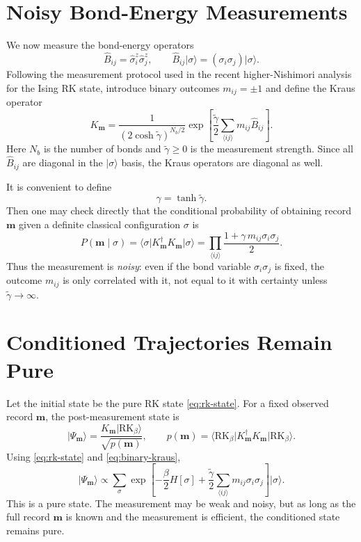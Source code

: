 \documentclass[11pt]{article}
\newcommand{\ket}[1]{\lvert #1\rangle}
\newcommand{\bra}[1]{\langle #1\rvert}
\begin{document}
\section{Noisy Bond-Energy Measurements}

We now measure the bond-energy operators
\begin{equation}
\hat B_{ij} = \hat\sigma_i^z \hat\sigma_j^z,
\qquad
\hat B_{ij}\ket{\sigma} = (\sigma_i\sigma_j)\ket{\sigma}.
\end{equation}
Following the measurement protocol used in the recent higher-Nishimori analysis for the Ising RK state, introduce binary outcomes $m_{ij}=\pm1$ and define the Kraus operator
\begin{equation}
K_{\bm m}
=
\frac{1}{(2\cosh\tilde\gamma)^{N_b/2}}
\exp\!\left[
\frac{\tilde\gamma}{2}\sum_{\langle ij\rangle} m_{ij}\hat B_{ij}
\right].
\label{eq:binary-kraus}
\end{equation}
Here $N_b$ is the number of bonds and $\tilde\gamma\ge 0$ is the measurement strength. Since all $\hat B_{ij}$ are diagonal in the $\ket{\sigma}$ basis, the Kraus operators are diagonal as well.

It is convenient to define
\begin{equation}
\gamma = \tanh\tilde\gamma.
\label{eq:gamma-def}
\end{equation}
Then one may check directly that the conditional probability of obtaining record $\bm m$ given a definite classical configuration $\sigma$ is
\begin{equation}
P(\bm m \mid \sigma)
=
\bra{\sigma} K_{\bm m}^\dagger K_{\bm m}\ket{\sigma}
=
\prod_{\langle ij\rangle}
\frac{1+\gamma\, m_{ij}\sigma_i\sigma_j}{2}.
\label{eq:binary-likelihood}
\end{equation}
Thus the measurement is \emph{noisy}: even if the bond variable $\sigma_i\sigma_j$ is fixed, the outcome $m_{ij}$ is only correlated with it, not equal to it with certainty unless $\tilde\gamma\to\infty$.

\section{Conditioned Trajectories Remain Pure}

Let the initial state be the pure RK state \eqref{eq:rk-state}. For a fixed observed record $\bm m$, the post-measurement state is
\begin{equation}
\ket{\Psi_{\bm m}}
=
\frac{K_{\bm m}\ket{\mathrm{RK}_\beta}}{\sqrt{p(\bm m)}},
\qquad
p(\bm m)=\bra{\mathrm{RK}_\beta}K_{\bm m}^\dagger K_{\bm m}\ket{\mathrm{RK}_\beta}.
\label{eq:conditioned-state}
\end{equation}
Using \eqref{eq:rk-state} and \eqref{eq:binary-kraus},
\begin{equation}
\ket{\Psi_{\bm m}}
\propto
\sum_\sigma
\exp\!\left[
-\frac{\beta}{2}H[\sigma]
+ \frac{\tilde\gamma}{2}\sum_{\langle ij\rangle} m_{ij}\sigma_i\sigma_j
\right]\ket{\sigma}.
\label{eq:conditioned-pure}
\end{equation}
This is a pure state. The measurement may be weak and noisy, but as long as the full record $\bm m$ is known and the measurement is efficient, the conditioned state remains pure.
\end{document}

